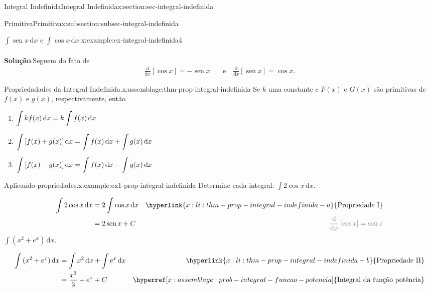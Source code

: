 \documentclass[oneside,10pt,]{article}
\newcommand{\blocktitlefont}{\relax}
\numberwithin{equation}{section}
\newcommand{\dd}{\mathrm{d}}
\newcommand{\integral}[2]{\displaystyle\int {#1}\,\dd {#2}}
\DeclareMathOperator{\sin}{sen}
\newcommand{\amp}{&}
\begin{document}
\begin{sectionptx}{Integral Indefinida}{}{Integral Indefinida}{}{}{x:section:sec-integral-indefinida}
\begin{subsectionptx}{Primitiva}{}{Primitiva}{}{}{x:subsection:subsec-integral-indefinida}
\begin{example}{\(\integral{\sin{x}}{x}\) e \(\integral{\cos{x}}{x}\).}{x:example:ex-integral-indefinida4}
\begin{align*}
\end{align*}
%
\par\smallskip%
\noindent\textbf{\blocktitlefont Solução}.\hypertarget{g:solution:idp23}{}\quad{}Seguem do fato de%
\begin{align*}
\frac{\dd }{\dd x}[\cos{x}]=-\sin{x} \amp \quad  \text{e} \quad \frac{\dd }{\dd x}[\sin{x}]=\cos{x}\text{.}
\end{align*}
%
\end{example}
\begin{assemblage}{Propriedadades da Integral Indefinida.}{x:assemblage:thm-prop-integral-indefinida}%
Se  \(k\) uma constante e \(F(x)\) e \(G(x)\) são primitivas de \(f(x)\) e \(g(x)\), respectivamente, então%
\begin{enumerate}[label=\Roman*)]
\item\hypertarget{x:li:thm-prop-integral-indefinida-a}{}\(\displaystyle \small{\integral{kf(x)}{x}=k\integral{f(x)}{x}}\)%
\item\hypertarget{x:li:thm-prop-integral-indefinida-b}{}\(\displaystyle \small{\integral{\left[ f(x) + g(x)\right]}{x}=\integral{f(x)}{x} + \integral{g(x)}{x}}\)%
\item\hypertarget{x:li:thm-prop-integral-indefinida-c}{}\(\displaystyle \small{\integral{\left[f(x) - g(x)\right]}{x}=\integral{f(x)}{x} - \integral{g(x)}{x}}\)%
\end{enumerate}
%
\end{assemblage}
\begin{example}{Aplicando propriedades.}{x:example:ex1-prop-integral-indefinida}%
Determine cada integral: \(\integral{2\cos{x}}{x}\).%
\par\smallskip%
\noindent%
\begin{align*}
\integral{2\cos{x}}{x} \amp = 2\integral{\cos{x}}{x} \amp \hyperlink{x:li:thm-prop-integral-indefinida-a}{\text{Propriedade I}}\\
\amp = 2\sin{x} + C\amp \color{gray}{\frac{\dd}{\dd x}\left[\cos{x}\right]=\sin{x}} 
\end{align*}
%
 \(\integral{(x^2+ e^x)}{x}\).%
\par\smallskip%
\noindent%
\begin{align*}
\integral{(x^2+ e^x)}{x}\amp = \integral{x^2}{x} + \integral{e^x}{x} \amp \hyperlink{x:li:thm-prop-integral-indefinida-b}{\text{Propriedade II}}\\
\amp = \frac{x^3}{3} + e^x + C \amp \hyperref[x:assemblage:prob-integral-funcao-potencia]{\text{Integral da função potência}}
\end{align*}

\end{example}
\end{subsectionptx}
\end{sectionptx}
\end{document}
